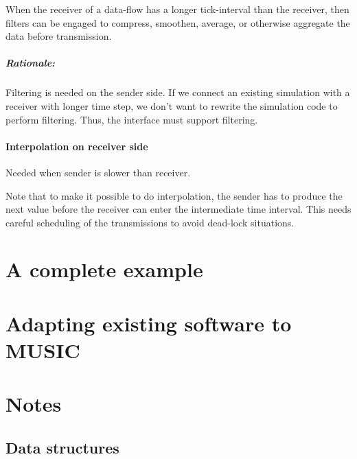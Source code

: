 \documentclass[a4paper]{report}
\newenvironment{rationale}%
{\par\paragraph{Rationale:}}%
{\par}
\begin{document}
When the receiver of a data-flow has a longer tick-interval than the
receiver, then filters can be engaged to compress, smoothen, average,
or otherwise aggregate the data before transmission.

\begin{rationale}
  Filtering is needed on the sender side.  If we connect an existing
  simulation with a receiver with longer time step, we don't want to
  rewrite the simulation code to perform filtering.  Thus, the
  interface must support filtering.
\end{rationale}


\subsubsection{Interpolation on receiver side}

Needed when sender is slower than receiver.

Note that to make it possible to do interpolation, the sender has to
produce the next value before the receiver can enter the intermediate
time interval.  This needs careful scheduling of the transmissions to
avoid dead-lock situations.

\chapter{A complete example}

\chapter{Adapting existing software to MUSIC}

\chapter{Notes}

\section{Data structures}
\end{document}
